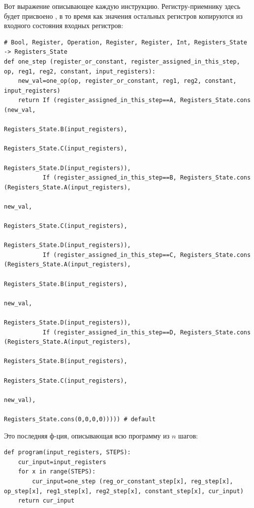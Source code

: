 Вот выражение описывающее каждую инструкцию.
Регистру-приемнику здесь будет присвоено ,
в то время как значения остальных регистров копируются из входного состояния входных регистров:


\begin{lstlisting}
# Bool, Register, Operation, Register, Register, Int, Registers_State -> Registers_State
def one_step (register_or_constant, register_assigned_in_this_step, op, reg1, reg2, constant, input_registers):
    new_val=one_op(op, register_or_constant, reg1, reg2, constant, input_registers)
    return If (register_assigned_in_this_step==A, Registers_State.cons (new_val,
                                                                        Registers_State.B(input_registers), 
                                                                        Registers_State.C(input_registers), 
                                                                        Registers_State.D(input_registers)),
           If (register_assigned_in_this_step==B, Registers_State.cons (Registers_State.A(input_registers), 
                                                                        new_val,
                                                                        Registers_State.C(input_registers),
                                                                        Registers_State.D(input_registers)), 
           If (register_assigned_in_this_step==C, Registers_State.cons (Registers_State.A(input_registers), 
                                                                        Registers_State.B(input_registers), 
                                                                        new_val,
                                                                        Registers_State.D(input_registers)), 
           If (register_assigned_in_this_step==D, Registers_State.cons (Registers_State.A(input_registers), 
                                                                        Registers_State.B(input_registers), 
                                                                        Registers_State.C(input_registers), 
                                                                        new_val),
                                                  Registers_State.cons(0,0,0,0))))) # default
\end{lstlisting}

Это последняя ф-ция, описывающая всю программу из $n$ шагов:

\begin{lstlisting}
def program(input_registers, STEPS):
    cur_input=input_registers
    for x in range(STEPS):
        cur_input=one_step (reg_or_constant_step[x], reg_step[x], op_step[x], reg1_step[x], reg2_step[x], constant_step[x], cur_input)
    return cur_input
\end{lstlisting}

